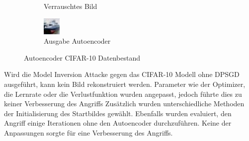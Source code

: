 \begin{figure}[!htb]
\begin{subfigure}[h]{0.3\textwidth}
  \caption{Verrauschtes Bild}
\end{subfigure}
\begin{subfigure}[h]{0.3\textwidth}
  \centering
  \includegraphics[width=\linewidth]{figures/autoencoder_cifar/3.jpg}
  \caption{Ausgabe Autoencoder}
\end{subfigure}
\caption{Autoencoder CIFAR-10 Datenbestand}
\label{fig:autoencoder_cifar}
\end{figure}

Wird die Model Inversion Attacke gegen das CIFAR-10 Modell ohne DPSGD ausgeführt, kann kein Bild rekonstruiert werden.
Parameter wie der Optimizer, die Lernrate oder die Verlustfunktion wurden angepasst, jedoch führte dies zu keiner Verbesserung des Angriffs 
Zusätzlich wurden unterschiedliche Methoden der Initialisierung des Startbildes gewählt.
Ebenfalls wurden evaluiert, den Angriff einige Iterationen ohne den Autoencoder durchzuführen.
Keine der Anpassungen sorgte für eine Verbesserung des Angriffs.

